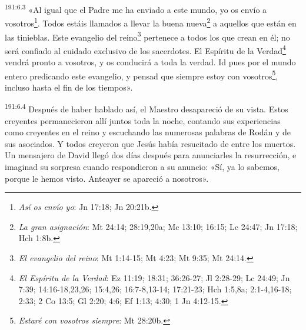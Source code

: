 \par 
\textsuperscript{191:6.3} «Al igual que el Padre me ha enviado a este mundo, yo os envío a vosotros\footnote{\textit{Así os envío yo}: Jn 17:18; Jn 20:21b.}. Todos estáis llamados a llevar la buena nueva\footnote{\textit{La gran asignación}: Mt 24:14; 28:19,20a; Mc 13:10; 16:15; Lc 24:47; Jn 17:18; Hch 1:8b.} a aquellos que están en las tinieblas. Este evangelio del reino\footnote{\textit{El evangelio del reino}: Mt 1:14-15; Mt 4:23; Mt 9:35; Mt 24:14.} pertenece a todos los que crean en él; no será confiado al cuidado exclusivo de los sacerdotes. El Espíritu de la Verdad\footnote{\textit{El Espíritu de la Verdad}: Ez 11:19; 18:31; 36:26-27; Jl 2:28-29; Lc 24:49; Jn 7:39; 14:16-18,23,26; 15:4,26; 16:7-8,13-14; 17:21-23; Hch 1:5,8a; 2:1-4,16-18; 2:33; 2 Co 13:5; Gl 2:20; 4:6; Ef 1:13; 4:30; 1 Jn 4:12-15.} vendrá pronto a vosotros, y os conducirá a toda la verdad. Id pues por el mundo entero predicando este evangelio, y pensad que siempre estoy con vosotros\footnote{\textit{Estaré con vosotros siempre}: Mt 28:20b.}, incluso hasta el fin de los tiempos».

\par 
\textsuperscript{191:6.4} Después de haber hablado así, el Maestro desapareció de su vista. Estos creyentes permanecieron allí juntos toda la noche, contando sus experiencias como creyentes en el reino y escuchando las numerosas palabras de Rodán y de sus asociados. Y todos creyeron que Jesús había resucitado de entre los muertos. Un mensajero de David llegó dos días después para anunciarles la resurrección, e imaginad su sorpresa cuando respondieron a su anuncio: «Sí, ya lo sabemos, porque le hemos visto. Anteayer se apareció a nosotros».